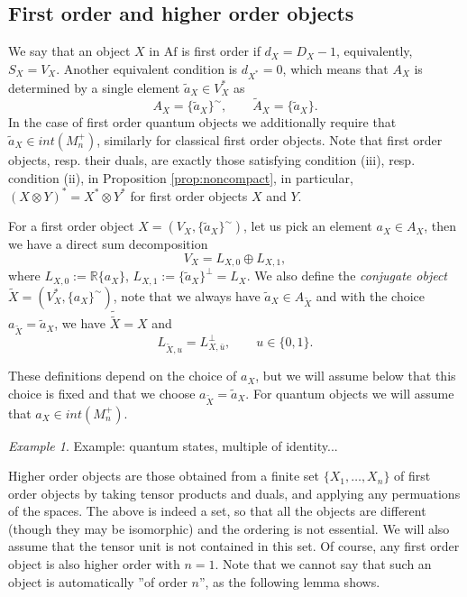 \documentclass[12pt]{article}
\theoremstyle{definition}
\theoremstyle{remark}
\newtheorem{exm}{Example}
\def \Af{\mathrm{Af}}
\begin{document}
\subsection{First order and higher order objects}


We say that an object $X$ in $\Af$ is first order if $d_X=D_X-1$, equivalently, $S_X=V_X$.
Another equivalent condition is $d_{X^*}=0$, which means that $A_X$ is determined by a
single element $\tilde a_X\in V_X^*$ as 
\[
A_X=\{\tilde a_X\}^\sim,\qquad \tilde A_X=\{\tilde a_X\}.
\]
In the case of first order quantum objects we additionally require that $\tilde a_X\in
int(M_n^+)$, similarly for classical first order objects.
Note that first order objects, resp. their duals, are exactly those satisfying
condition (iii), resp. condition (ii), in Proposition \ref{prop:noncompact}, in
particular, $(X\otimes Y)^*=X^*\otimes Y^*$ for first order objects $X$ and $Y$.

For a first order object $X=(V_X, \{\tilde a_X\}^\sim)$, let us pick an element $a_X\in
A_X$, then we have a direct sum decomposition
\[
V_X=L_{X,0}\oplus L_{X,1},
\]
where $L_{X,0}:= \mathbb R\{a_X\}$, $L_{X,1}:=\{\tilde a_X\}^\perp=L_X$.
We also define the {\em conjugate object} $\tilde X=(V_X^*,\{a_X\}^\sim)$, note that we always
have $\tilde a_X\in A_{\tilde X}$ and with the choice $a_{\tilde X}=\tilde a_X$, we have
$\tilde{\tilde X}=X$ and 
\begin{equation}\label{eq:complement}
L_{\tilde X,u}=L_{X,\bar u}^\perp,\qquad u\in \{0,1\}.
\end{equation}

These  definitions depend on the choice of $a_X$, but we will assume below that this
choice is fixed and that we choose $a_{\tilde X}=\tilde a_X$. For quantum objects we will
assume that $a_X\in int(M_n^+)$.


\begin{exm} Example: quantum states, multiple of identity...

\end{exm}


Higher order objects are those obtained from a finite set $\{X_1,\dots,X_n\}$ of first order objects by
taking tensor products and duals, and applying any permuations of the spaces. The above is indeed a set, so that all the objects are
different (though they may be isomorphic) and the ordering is not essential. We will also
assume that the tensor unit is not contained in this set. Of course, any first order
object is also higher order with $n=1$. Note that we cannot say that
such an object is automatically ''of order $n$'', as the following lemma shows. 
\end{document}
